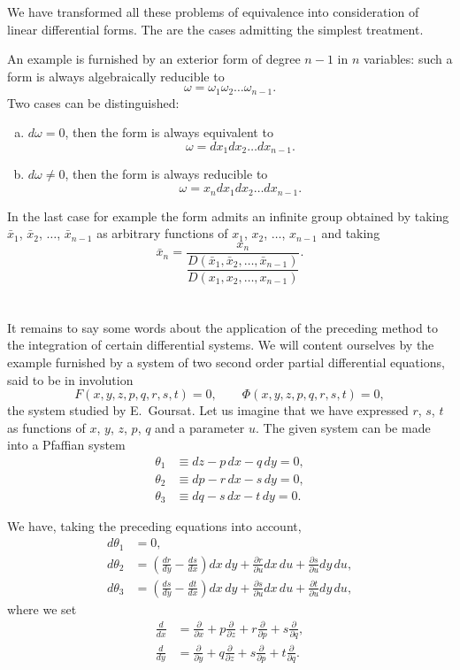 \documentclass[leqno,11pt]{article}
\newcommand{\pd}{\partial}
\theoremstyle{shape1}
\theoremstyle{shape0}
\theoremstyle{shape2}
\theoremstyle{definition}
\begin{document}
\mbox{}

We have transformed all these problems of equivalence into consideration of linear differential forms. The are the cases admitting the simplest treatment.

An example is furnished by an exterior form of degree $n-1$ in $n$ variables: such a form is always algebraically reducible to 
\[
\omega=\omega_{1}\omega_{2}\dots \omega_{n-1}.
\]
Two cases can be distinguished:
\begin{enumerate}[a.]
\item $d\omega=0$, then the form is always equivalent to
\[
\omega=dx_{1}dx_{2}\dots dx_{n-1}.
\]
\item $d\omega\neq 0$, then the form is always reducible to
\[
\omega=x_{n}dx_{1}dx_{2}\dots dx_{n-1}.
\]
\end{enumerate}

In the last case for example the form admits an infinite group obtained by taking $\bar x_{1}$, $\bar x_{2}$, $\dots$, $\bar x_{n-1}$ as arbitrary functions of $x_{1}$, $x_{2}$, $\dots$, $x_{n-1}$ and taking
\[
\bar x_{n}=\frac{x_{n}}{\dfrac{D(\bar x_{1},\bar x_{2},\dots,\bar x_{n-1})}{D(x_{1},x_{2},\dots,x_{n-1})}}.
\]

\section{}
\label{sec:5}

It remains to say some words about the application of the preceding method to the integration of certain differential systems. We will content ourselves by the example furnished by a system of two second order partial differential equations, said to be in involution
\[
F(x,y,z,p,q,r,s,t)=0,\qquad \Phi(x,y,z,p,q,r,s,t)=0,
\]
the system studied by E.~Goursat. Let us imagine that we have expressed $r$, $s$, $t$ as functions of $x$, $y$, $z$, $p$, $q$ and a parameter $u$. The given system can be made into a Pfaffian system
\begin{align*}
  \theta_{1}&\equiv dz-p\,dx-q\,dy=0,\\
  \theta_{2}&\equiv dp-r\,dx-s\,dy=0,\\
  \theta_{3}&\equiv dq-s\,dx-t\,dy=0.
\end{align*}

We have, taking the preceding equations into account, 
\begin{align*}
  d\theta_{1}&=0,\\
  d\theta_{2}&=\left(\frac{dr}{dy}-\frac{ds}{dx}\right)dx\,dy+\frac{\pd r}{\pd u}dx\,du+\frac{\pd s}{\pd u}dy\,du,\\
  d\theta_{3}&=\left(\frac{ds}{dy}-\frac{dt}{dx}\right)dx\,dy+\frac{\pd s}{\pd u}dx\,du+\frac{\pd t}{\pd u}dy\,du,
\end{align*}
where we set
\begin{align*}
  \frac{d}{dx}&=\frac{\pd}{\pd x}+p\frac{\pd}{\pd z}+r\frac{\pd}{\pd p}+s\frac{\pd}{\pd q},\\
  \frac{d}{dy}&=\frac{\pd}{\pd y}+q\frac{\pd}{\pd z}+s\frac{\pd}{\pd p}+t\frac{\pd}{\pd q}.
\end{align*}
\end{document}

